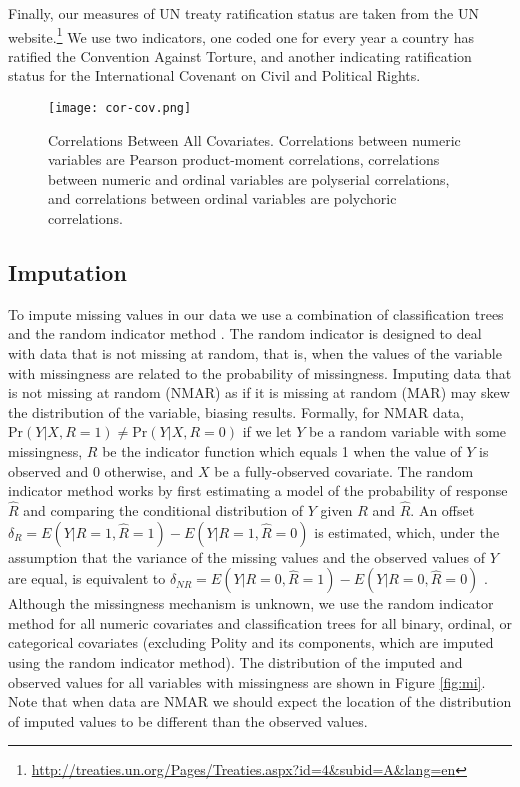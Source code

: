 \documentclass[11pt]{article}
\begin{document}
Finally, our measures of UN treaty ratification status are taken from the UN website.\footnote{\url{http://treaties.un.org/Pages/Treaties.aspx?id=4&subid=A&lang=en}} We use two indicators, one coded one for every year a country has ratified the Convention Against Torture, and another indicating ratification status for the International Covenant on Civil and Political Rights. 

\begin{figure}[!htpb]
\texttt{[image: cor-cov.png]}
\caption{Correlations Between All Covariates. Correlations between numeric variables are Pearson product-moment correlations, correlations between numeric and ordinal variables are polyserial correlations, and correlations between ordinal variables are polychoric correlations.} 
\label{fig:cor-cov}
\end{figure}

\subsection{Imputation}

To impute missing values in our data we use a combination of classification trees and the random indicator method \citep{buuren2011mice,jolani2012}. The random indicator is designed to deal with data that is not missing at random, that is, when the values of the variable with missingness are related to the probability of missingness. Imputing data that is not missing at random (NMAR) as if it is missing at random (MAR) may skew the distribution of the variable, biasing results. Formally, for NMAR data, $\text{Pr}(Y|X, R=1) \neq \text{Pr}(Y|X, R=0)$ if we let $Y$ be a random variable with some missingness, $R$ be the indicator function which equals 1 when the value of $Y$ is observed and 0 otherwise, and $X$ be a fully-observed covariate. The random indicator method works by first estimating a model of the probability of response $\hat{R}$ and comparing the conditional distribution of $Y$ given $R$ and $\hat{R}$. An offset $\delta_R = E(Y|R=1,\hat{R}=1) - E(Y|R=1,\hat{R}=0)$ is estimated, which, under the assumption that the variance of the missing values and the observed values of $Y$ are equal, is equivalent to $\delta_{NR} = E(Y|R=0,\hat{R}=1) - E(Y|R=0,\hat{R}=0)$ \citep{jolani2012}. Although the missingness mechanism is unknown, we use the random indicator method for all numeric covariates and classification trees for all binary, ordinal, or categorical covariates (excluding Polity and its components, which are imputed using the random indicator method). The distribution of the imputed and observed values for all variables with missingness are shown in Figure \ref{fig:mi}. Note that when data are NMAR we should expect the location of the distribution of imputed values to be different than the observed values.
\end{document}
